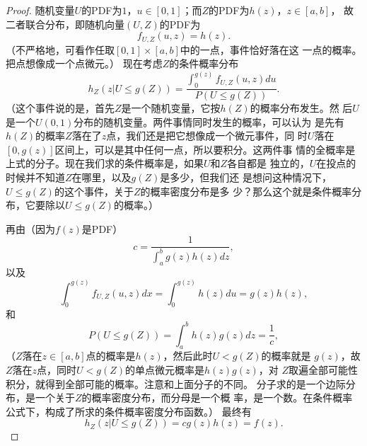 \begin{proof}
随机变量$U$的PDF为$1$，$u \in [0, 1]$；而$Z$的PDF为$h(z)$，$z \in [a, b]$，
  故二者联合分布，即随机向量$(U, Z)$的PDF为
  \begin{equation}
    f_{U, Z}(u, z) = h(z).
  \end{equation}
  （不严格地，可看作任取$[0, 1] \times [a, b]$中的一点，事件恰好落在这
    一点的概率。把点想像成一个点微元。）
现在考虑$Z$的条件概率分布
  \begin{equation}
    h_Z(z\left|U \leq g(Z)\right.) =
    \frac{\int_0^{g(z)}f_{U, Z}(u, z)du}{P(U \leq g(Z))}.
    \label{eq::AR_cond_h}
  \end{equation}
（这个事件说的是，首先$Z$是一个随机变量，它按$h(Z)$的概率分布发生。然
  后$U$是一个$U(0, 1)$分布的随机变量。两件事情同时发生的概率，可以认为
  是先有$h(Z)$的概率$Z$落在了$z$点，我们还是把它想像成一个微元事件，同
  时$U$落在$[0, g(z)]$区间上，可以是其中任何一点，所以要积分。这两件事
  情的全概率是上式的分子。现在我们求的条件概率是，如果$U$和$Z$各自都是
  独立的，$U$在投点的时候并不知道$Z$在哪里，以及$g(Z)$是多少，但我们还
  是想问这种情况下，$U \leq g(Z)$的这个事件，关于$Z$的概率密度分布是多
  少？那么这个就是条件概率分布，它要除以$U \leq g(Z)$的概率。）
  
  再由（因为$f(z)$是PDF）
  \begin{equation}
    c = \frac{1}{\int_{a}^b g(z) h(z)dz},
    \label{eq::AR_dri_c}
  \end{equation}
  以及
  \begin{equation}
    \int_0^{g(z)}f_{U, Z}(u, z)dx = \int_0^{g(z)} h(z) du = g(z) h(z),
    \label{eq::AR_cond_f}
  \end{equation}
  和
  \begin{equation}
    P(U \leq g(Z)) = \int_{a}^b h (z) g(z) dz = \frac{1}{c},
    \label{eq::AR_conf_f_bottom}
  \end{equation}
（$Z$落在$z \in [a, b]$点的概率是$h(z)$，然后此时$U < g(Z)$的概率就是
  $g(z)$，故$Z$落在$z$点，同时$U < g(Z)$的单点微元概率是$h(z)g(z)$，对
  $Z$取遍全部可能性积分，就得到全部可能的概率。注意和上面分子的不同。
  分子求的是一个边际分布，是一个关于$Z$的概率密度分布，而分母是一个概
  率，是一个数。在条件概率公式下，构成了所求的条件概率密度分布函数。）
  最终有
  \begin{equation}
    h_Z(z\left|U \leq g(Z)\right.) = c g(z) h(z) = f(z).
    \label{eq::dri_f}
  \end{equation}
\end{proof}

